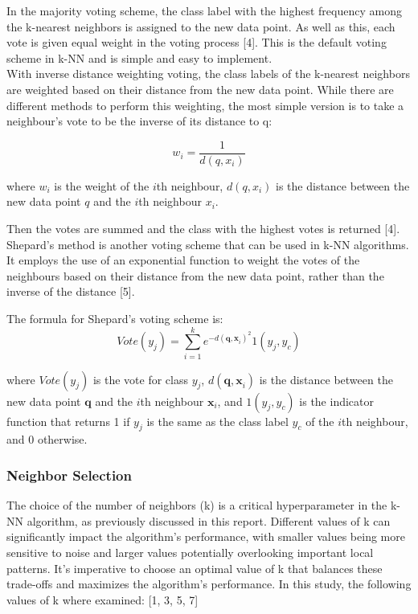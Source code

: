 In the majority voting scheme, the class label with the highest frequency among the k-nearest neighbors is assigned to the new data point.
As well as this, each vote is given equal weight in the voting process [4].
This is the default voting scheme in k-NN and is simple and easy to implement.\\

With inverse distance weighting voting, the class labels of the k-nearest neighbors are weighted based on their distance from the new data point.
While there are different methods to perform this weighting, the most simple version is to take a neighbour's vote to be the inverse
of its distance to q:

\[ w_i = \frac{1}{d(q, x_i)} \]

where \(w_i\) is the weight of the \(i\)th neighbour, \(d(q, x_i)\) is the distance between the new data point \(q\) and the \(i\)th neighbour \(x_i\).

Then the votes are summed and the class with the highest votes is returned [4].\\

Shepard's method is another voting scheme that can be used in k-NN algorithms. 
It employs the use of an exponential function to weight the votes of the neighbours based on their distance from the new data point,
rather than the inverse of the distance [5].

The formula for Shepard's voting scheme is:
\begin{equation} 
    Vote(y_j)=\sum_{i=1}^k e^{-d(\mathbf{q,x}_i)^2}1(y_j,y_c)
\end{equation}

where \(Vote(y_j)\) is the vote for class \(y_j\), \(d(\mathbf{q,x}_i)\) is the
distance between the new data point \(\mathbf{q}\) and the \(i\)th neighbour \(\mathbf{x}_i\),
and \(1(y_j,y_c)\) is the indicator function that returns 1 if \(y_j\) is the same as
the class label \(y_c\) of the \(i\)th neighbour, and 0 otherwise.\\

\subsubsection*{Neighbor Selection}
The choice of the number of neighbors (k) is a critical hyperparameter in the k-NN algorithm, as previously discussed in this report.
Different values of k can significantly impact the algorithm's performance,
with smaller values being more sensitive to noise and larger values potentially overlooking important local patterns.
It's imperative to choose an optimal value of k that balances these trade-offs and maximizes the algorithm's performance.
In this study, the following values of k where examined: [1, 3, 5, 7] \\

